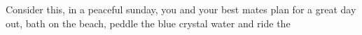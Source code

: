 Consider this, in a peaceful sunday, you and your best mates plan for a great day out, bath on the beach, peddle the blue crystal water and ride the  